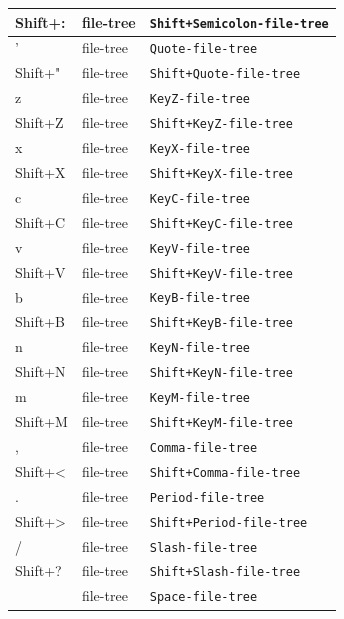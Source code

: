 \documentclass[11pt, a4paper]{article}
\begin{document}
\begin{appendices}
\begin{longtable}{|p{}|p{}|p{}|}
    Shift+: & file-tree & \texttt{Shift+Semicolon-file-tree} \\ \hline
    ' & file-tree & \texttt{Quote-file-tree} \\ \hline
    Shift+" & file-tree & \texttt{Shift+Quote-file-tree} \\ \hline
    z & file-tree & \texttt{KeyZ-file-tree} \\ \hline
    Shift+Z & file-tree & \texttt{Shift+KeyZ-file-tree} \\ \hline
    x & file-tree & \texttt{KeyX-file-tree} \\ \hline
    Shift+X & file-tree & \texttt{Shift+KeyX-file-tree} \\ \hline
    c & file-tree & \texttt{KeyC-file-tree} \\ \hline
    Shift+C & file-tree & \texttt{Shift+KeyC-file-tree} \\ \hline
    v & file-tree & \texttt{KeyV-file-tree} \\ \hline
    Shift+V & file-tree & \texttt{Shift+KeyV-file-tree} \\ \hline
    b & file-tree & \texttt{KeyB-file-tree} \\ \hline
    Shift+B & file-tree & \texttt{Shift+KeyB-file-tree} \\ \hline
    n & file-tree & \texttt{KeyN-file-tree} \\ \hline
    Shift+N & file-tree & \texttt{Shift+KeyN-file-tree} \\ \hline
    m & file-tree & \texttt{KeyM-file-tree} \\ \hline
    Shift+M & file-tree & \texttt{Shift+KeyM-file-tree} \\ \hline
    , & file-tree & \texttt{Comma-file-tree} \\ \hline
    Shift+< & file-tree & \texttt{Shift+Comma-file-tree} \\ \hline
    . & file-tree & \texttt{Period-file-tree} \\ \hline
    Shift+> & file-tree & \texttt{Shift+Period-file-tree} \\ \hline
    / & file-tree & \texttt{Slash-file-tree} \\ \hline
    Shift+? & file-tree & \texttt{Shift+Slash-file-tree} \\ \hline
      & file-tree & \texttt{Space-file-tree} \\ \hline
    \end{longtable}

\end{appendices}
\end{document}
